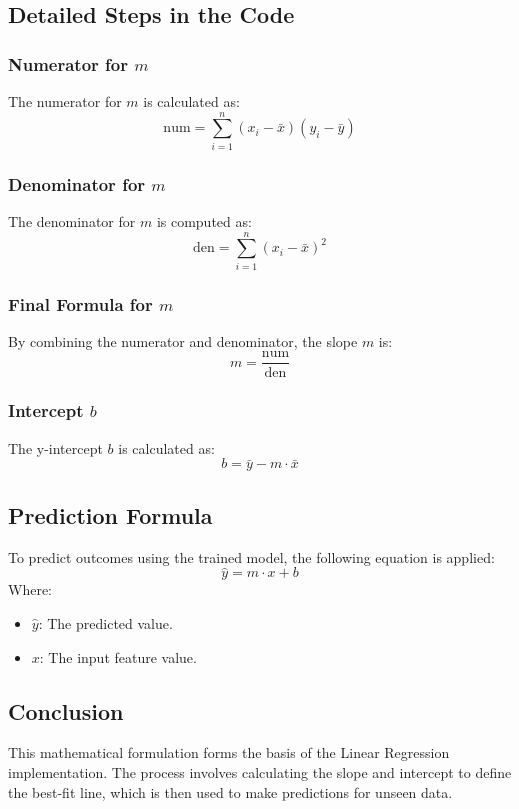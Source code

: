 \documentclass{article}
\begin{document}
\subsection*{Detailed Steps in the Code}
\subsubsection*{Numerator for \( m \)}
The numerator for \( m \) is calculated as:
\[
\text{num} = \sum_{i=1}^n (x_i - \bar{x})(y_i - \bar{y})
\]

\subsubsection*{Denominator for \( m \)}
The denominator for \( m \) is computed as:
\[
\text{den} = \sum_{i=1}^n (x_i - \bar{x})^2
\]

\subsubsection*{Final Formula for \( m \)}
By combining the numerator and denominator, the slope \( m \) is:
\[
m = \frac{\text{num}}{\text{den}}
\]

\subsubsection*{Intercept \( b \)}
The y-intercept \( b \) is calculated as:
\[
b = \bar{y} - m \cdot \bar{x}
\]

\subsection*{Prediction Formula}
To predict outcomes using the trained model, the following equation is applied:
\[
\hat{y} = m \cdot x + b
\]
Where:
\begin{itemize}
    \item \( \hat{y} \): The predicted value.
    \item \( x \): The input feature value.
\end{itemize}

\subsection*{Conclusion}
This mathematical formulation forms the basis of the Linear Regression implementation. The process involves calculating the slope and intercept to define the best-fit line, which is then used to make predictions for unseen data.
\end{document}
